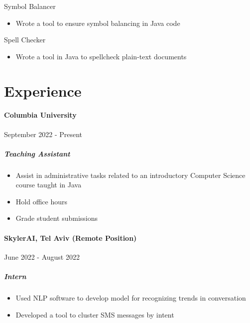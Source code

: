 \documentclass[10pt]{article}
\begin{document}
Symbol Balancer
\begin{itemize}
    \item Wrote a tool to ensure symbol balancing in Java code
\end{itemize}

Spell Checker
\begin{itemize}
    \item Wrote a tool in Java to spellcheck plain-text documents
\end{itemize}


\vfill
\section*{Experience}

\paragraph*{Columbia University} \hfill September 2022 - Present
\subparagraph*{Teaching Assistant}
\begin{itemize}
    \item Assist in administrative tasks related to an introductory Computer Science course taught in Java
    \item Hold office hours
    \item Grade student submissions
\end{itemize}

\paragraph*{SkylerAI, Tel Aviv (Remote Position)} \hfill June 2022 - August 2022
\subparagraph*{Intern}
\begin{itemize}
    \item Used NLP software to develop model for recognizing trends in conversation
    \item Developed a tool to cluster SMS messages by intent
\end{itemize}
\end{document}
